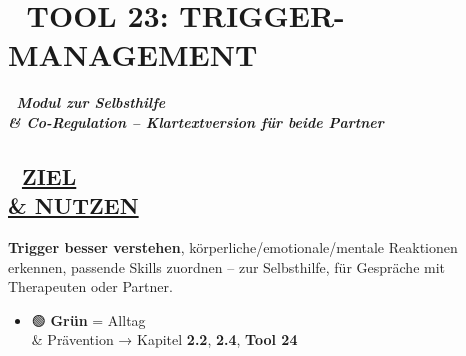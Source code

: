 \hypertarget{tool-23-trigger-management}{%
\section{\texorpdfstring{📄 \textbf{TOOL 23: TRIGGER-MANAGEMENT}}{📄 TOOL 23: TRIGGER-MANAGEMENT}}\label{tool-23-trigger-management}}

🧩 \emph{\textbf{Modul zur Selbsthilfe \\& Co-Regulation -- Klartextversion für beide Partner}}

\hypertarget{ziel-nutzen}{%
\subsection{\texorpdfstring{🎯 \textbf{\ul{ZIEL \\& NUTZEN}}}{🎯 ZIEL \\& NUTZEN}}\label{ziel-nutzen}}

\textbf{Trigger besser verstehen}, körperliche/emotionale/mentale Reaktionen erkennen, passende Skills zuordnen -- zur Selbsthilfe, für Gespräche mit Therapeuten oder Partner.

\begin{itemize}
\tightlist
\item
  🟢 \textbf{Grün} = Alltag \\& Prävention → Kapitel \textbf{2.2}, \textbf{2.4}, \textbf{Tool 24}
\end{itemize}